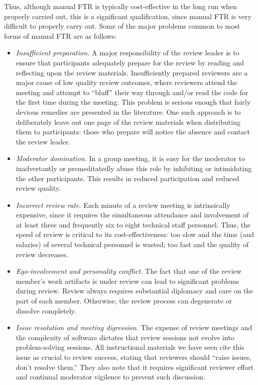 Thus, although manual FTR is typically cost-effective in the long run when
properly carried out, this is a significant qualification, since manual FTR
is very difficult to properly carry out. Some of the major problems common
to most forms of manual FTR are as follows:

\begin{itemize}
\item {\em Insufficient preparation.} A major responsibility of the
  review leader is to ensure that participants adequately prepare for the
  review by reading and reflecting upon the review materials.
  Insufficiently prepared reviewers are a major cause of low quality review
  outcomes, where reviewers attend the meeting and attempt to ``bluff''
  their way through and/or read the code for the first time during the meeting.
  This problem is serious enough that fairly devious remedies are presented
  in the literature. One such approach is to deliberately leave out one
  page of the review materials when distributing them to participants:
  those who prepare will notice the absence and contact the review leader.
  
\item {\em Moderator domination.} In a group meeting, it is easy for the
  moderator to inadvertantly or premeditatedly abuse this role by
  inhibiting or intimidating the other participants.  This results in
  reduced participation and reduced review quality.

\item {\em Incorrect review rate.} Each minute of a review meeting is
  intrinsically expensive, since it requires the simultaneous attendance
  and involvement of at least three and frequently six to eight technical
  staff personnel.  Thus, the speed of review is critical to its
  cost-effectiveness: too slow and the time (and salaries) of several
  technical personnel is wasted; too fast and the quality of review
  decreases.

\item {\em Ego-involvement and personality conflict.} The fact that one of
  the review member's work artifacts is under review can lead to
  significant problems during review.  Review always requires substantial
  diplomacy and care on the part of each member.  Otherwise, the review
  process can degenerate or dissolve completely.

\item {\em Issue resolution and meeting digression.} The expense of
  review meetings and the complexity of software dictates that review
  sessions not evolve into problem-solving sessions.  All instructional
  materials we have seen cite this issue as crucial to review success,
  stating that reviewers should ``raise issues, don't resolve them.''  They
  also note that it requires significant reviewer effort and continual
  moderator vigilence to prevent such discussion.
  

\end{itemize}
